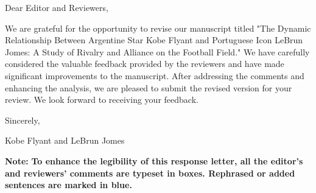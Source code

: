\thispagestyle{empty}
\noindent Dear Editor and Reviewers, 

We are grateful for the opportunity to revise our manuscript titled "The Dynamic Relationship Between Argentine Star Kobe Flyant and Portuguese Icon LeBrun Jomes: A Study of Rivalry and Alliance on the Football Field." We have carefully considered the valuable feedback provided by the reviewers and have made significant improvements to the manuscript. After addressing the comments and enhancing the analysis, we are pleased to submit the revised version for your review. We look forward to receiving your feedback.






\vspace{8em}

\noindent Sincerely,

\noindent Kobe Flyant and LeBrun Jomes 

\vfill
\noindent 
\textbf{Note:} \textbf{To enhance the legibility of this response letter, all the editor's and reviewers' comments are typeset in boxes. Rephrased or added sentences are marked in blue.}
